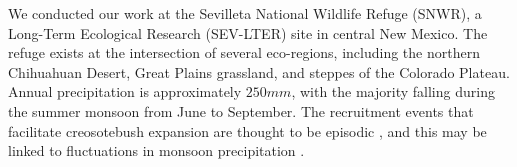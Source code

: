 \documentclass[11pt]{article}\usepackage[]{graphicx}\usepackage[]{color}
\begin{document}
We conducted our work at the Sevilleta National Wildlife Refuge (SNWR), a Long-Term Ecological Research (SEV-LTER) site in central New Mexico.
The refuge exists at the intersection of several eco-regions, including the northern Chihuahuan Desert, Great Plains grassland, and steppes of the Colorado Plateau.
Annual precipitation is approximately $250 mm$, with the majority falling during the summer monsoon from June to September.
The recruitment events that facilitate creosotebush expansion are thought to be episodic \citep{peters2012long}, and this may be linked to fluctuations in monsoon precipitation \citep{boyd1983postdispersal, bowers2004temporal}.

\end{document}

